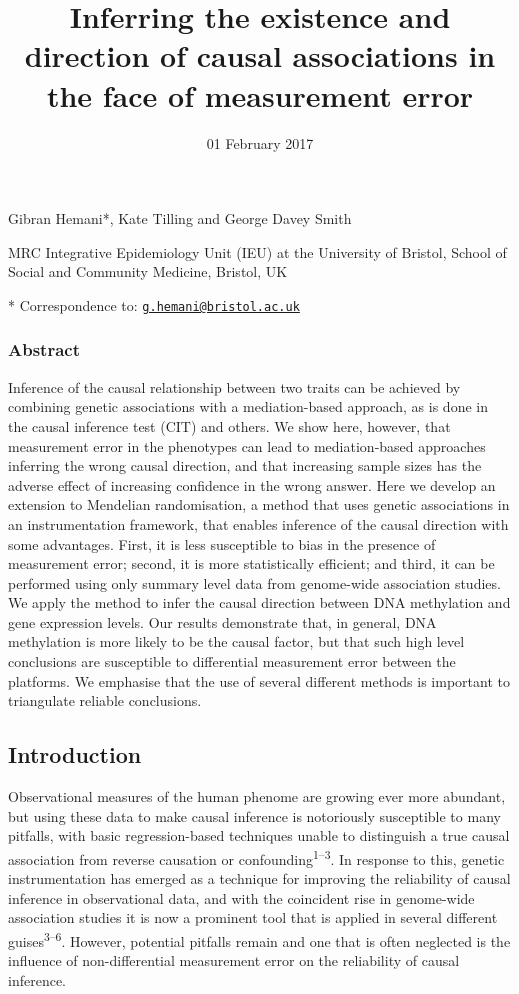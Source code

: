 \documentclass[]{article}
\title{Inferring the existence and direction of causal associations in the face
of measurement error}
\author{}
\date{01 February 2017}
\begin{document}
\maketitle

Gibran Hemani*, Kate Tilling and George Davey Smith

MRC Integrative Epidemiology Unit (IEU) at the University of Bristol,
School of Social and Community Medicine, Bristol, UK

* Correspondence to:
\href{mailto:g.hemani@bristol.ac.uk}{\nolinkurl{g.hemani@bristol.ac.uk}}

\subsubsection{Abstract}\label{abstract}

Inference of the causal relationship between two traits can be achieved
by combining genetic associations with a mediation-based approach, as is
done in the causal inference test (CIT) and others. We show here,
however, that measurement error in the phenotypes can lead to
mediation-based approaches inferring the wrong causal direction, and
that increasing sample sizes has the adverse effect of increasing
confidence in the wrong answer. Here we develop an extension to
Mendelian randomisation, a method that uses genetic associations in an
instrumentation framework, that enables inference of the causal
direction with some advantages. First, it is less susceptible to bias in
the presence of measurement error; second, it is more statistically
efficient; and third, it can be performed using only summary level data
from genome-wide association studies. We apply the method to infer the
causal direction between DNA methylation and gene expression levels. Our
results demonstrate that, in general, DNA methylation is more likely to
be the causal factor, but that such high level conclusions are
susceptible to differential measurement error between the platforms. We
emphasise that the use of several different methods is important to
triangulate reliable conclusions.

\subsection{Introduction}\label{introduction}

Observational measures of the human phenome are growing ever more
abundant, but using these data to make causal inference is notoriously
susceptible to many pitfalls, with basic regression-based techniques
unable to distinguish a true causal association from reverse causation
or confounding\textsuperscript{1--3}. In response to this, genetic
instrumentation has emerged as a technique for improving the reliability
of causal inference in observational data, and with the coincident rise
in genome-wide association studies it is now a prominent tool that is
applied in several different guises\textsuperscript{3--6}. However,
potential pitfalls remain and one that is often neglected is the
influence of non-differential measurement error on the reliability of
causal inference.
\end{document}
